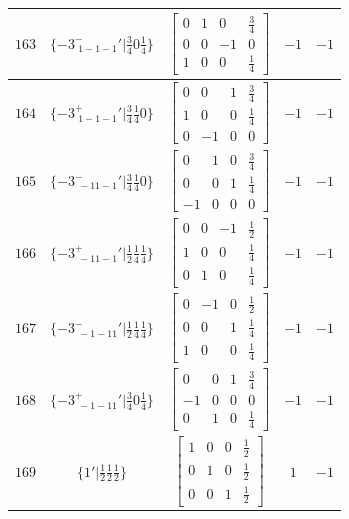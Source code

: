 \documentclass[fleqn,8pt]{jsarticle}
\begin{document}
\begin{longtable}{ccccc}
$ 163 $ & $ \{-3^{-}_{\,\,1-1-1}{}'|\frac{3}{4} 0 \frac{1}{4}\} $ & $ \begin{bmatrix} 0 & 1 & 0 & \frac{3}{4} \\ 0 & 0 & -1 & 0 \\ 1 & 0 & 0 & \frac{1}{4} \end{bmatrix} $ & $ -1 $ & $ -1 $ \\ \hline
$ 164 $ & $ \{-3^{+}_{\,\,1-1-1}{}'|\frac{3}{4} \frac{1}{4} 0\} $ & $ \begin{bmatrix} 0 & 0 & 1 & \frac{3}{4} \\ 1 & 0 & 0 & \frac{1}{4} \\ 0 & -1 & 0 & 0 \end{bmatrix} $ & $ -1 $ & $ -1 $ \\ \hline
$ 165 $ & $ \{-3^{-}_{\,\,-11-1}{}'|\frac{3}{4} \frac{1}{4} 0\} $ & $ \begin{bmatrix} 0 & 1 & 0 & \frac{3}{4} \\ 0 & 0 & 1 & \frac{1}{4} \\ -1 & 0 & 0 & 0 \end{bmatrix} $ & $ -1 $ & $ -1 $ \\ \hline
$ 166 $ & $ \{-3^{+}_{\,\,-11-1}{}'|\frac{1}{2} \frac{1}{4} \frac{1}{4}\} $ & $ \begin{bmatrix} 0 & 0 & -1 & \frac{1}{2} \\ 1 & 0 & 0 & \frac{1}{4} \\ 0 & 1 & 0 & \frac{1}{4} \end{bmatrix} $ & $ -1 $ & $ -1 $ \\ \hline
$ 167 $ & $ \{-3^{-}_{\,\,-1-11}{}'|\frac{1}{2} \frac{1}{4} \frac{1}{4}\} $ & $ \begin{bmatrix} 0 & -1 & 0 & \frac{1}{2} \\ 0 & 0 & 1 & \frac{1}{4} \\ 1 & 0 & 0 & \frac{1}{4} \end{bmatrix} $ & $ -1 $ & $ -1 $ \\ \hline
$ 168 $ & $ \{-3^{+}_{\,\,-1-11}{}'|\frac{3}{4} 0 \frac{1}{4}\} $ & $ \begin{bmatrix} 0 & 0 & 1 & \frac{3}{4} \\ -1 & 0 & 0 & 0 \\ 0 & 1 & 0 & \frac{1}{4} \end{bmatrix} $ & $ -1 $ & $ -1 $ \\ \hline
$ 169 $ & $ \{1{}'|\frac{1}{2} \frac{1}{2} \frac{1}{2}\} $ & $ \begin{bmatrix} 1 & 0 & 0 & \frac{1}{2} \\ 0 & 1 & 0 & \frac{1}{2} \\ 0 & 0 & 1 & \frac{1}{2} \end{bmatrix} $ & $ 1 $ & $ -1 $ \\ \hline

\end{longtable}
\end{document}
